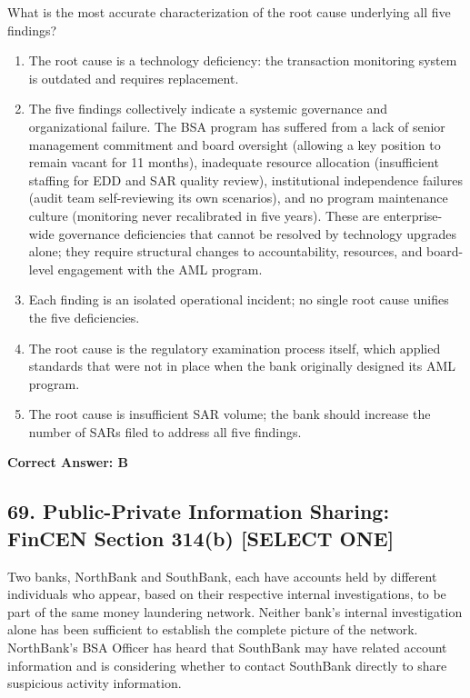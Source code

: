 \documentclass[11pt,a4paper]{article}
\begin{document}
	What is the most accurate characterization of the root cause underlying all five findings?
	
	\begin{enumerate}[label=\Alph*.]
		\item The root cause is a technology deficiency: the transaction monitoring system is outdated and requires replacement.
		\item The five findings collectively indicate a systemic governance and organizational failure. The BSA program has suffered from a lack of senior management commitment and board oversight (allowing a key position to remain vacant for 11 months), inadequate resource allocation (insufficient staffing for EDD and SAR quality review), institutional independence failures (audit team self-reviewing its own scenarios), and no program maintenance culture (monitoring never recalibrated in five years). These are enterprise-wide governance deficiencies that cannot be resolved by technology upgrades alone; they require structural changes to accountability, resources, and board-level engagement with the AML program.
		\item Each finding is an isolated operational incident; no single root cause unifies the five deficiencies.
		\item The root cause is the regulatory examination process itself, which applied standards that were not in place when the bank originally designed its AML program.
		\item The root cause is insufficient SAR volume; the bank should increase the number of SARs filed to address all five findings.
	\end{enumerate}
	\textbf{Correct Answer: B}
	
	\subsection{69. Public-Private Information Sharing: FinCEN Section 314(b) \textnormal{[SELECT ONE]}}
	
	Two banks, NorthBank and SouthBank, each have accounts held by different individuals who appear, based on their respective internal investigations, to be part of the same money laundering network. Neither bank's internal investigation alone has been sufficient to establish the complete picture of the network. NorthBank's BSA Officer has heard that SouthBank may have related account information and is considering whether to contact SouthBank directly to share suspicious activity information.
	
\end{document}
